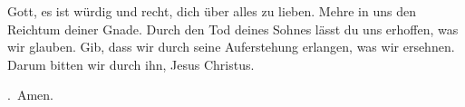 \lettrine[lines=3]{G}{}ott, es ist würdig und recht, dich über alles zu lieben. Mehre in uns den Reichtum deiner Gnade. Durch den Tod deines Sohnes lässt du uns erhoffen, was wir glauben. Gib, dass wir durch seine Auferstehung erlangen, was wir ersehnen. Darum bitten wir durch ihn, Jesus Christus.
\par \Rbar.~Amen.
